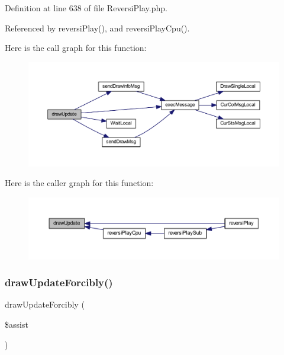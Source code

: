 Definition at line 638 of file Reversi\+Play.\+php.



Referenced by reversi\+Play(), and reversi\+Play\+Cpu().

Here is the call graph for this function\+:
\nopagebreak
\begin{figure}[H]
\begin{center}
\leavevmode
\includegraphics[width=350pt]{class_reversi_play_a52029e5f2e049767d1f67c3f5c18ce9f_cgraph}
\end{center}
\end{figure}
Here is the caller graph for this function\+:
\nopagebreak
\begin{figure}[H]
\begin{center}
\leavevmode
\includegraphics[width=350pt]{class_reversi_play_a52029e5f2e049767d1f67c3f5c18ce9f_icgraph}
\end{center}
\end{figure}
\mbox{\label{class_reversi_play_a3ae28eb121caf59932218ea7d1fca81d}} 
\subsubsection{\texorpdfstring{draw\+Update\+Forcibly()}{drawUpdateForcibly()}}
{\footnotesize\ttfamily draw\+Update\+Forcibly (\begin{DoxyParamCaption}\item[{}]{\$assist }\end{DoxyParamCaption})}



